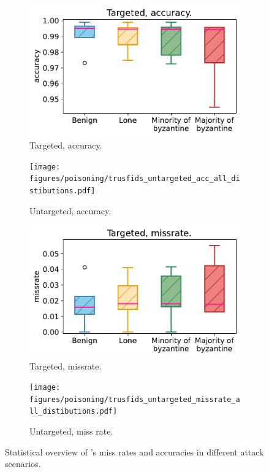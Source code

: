 \begin{figure}
  \centering 
  \begin{subfigure}{0.45\columnwidth}
    \centering 
    \includegraphics[width=\linewidth]{figures/poisoning/trusfids_targeted_acc_all_distibutions.pdf}    \caption{Targeted, accuracy.}
    \label{fig:trusfids_targeted_acc_all_distibutions}
  \end{subfigure}
  \begin{subfigure}{0.45\columnwidth}
    \centering 
    \texttt{[image: figures/poisoning/trusfids\_untargeted\_acc\_all\_distibutions.pdf]}    \caption{Untargeted, accuracy.}
    \label{fig:trusfids_untargeted_acc_all_distibutions}
  \end{subfigure}
    
    \begin{subfigure}{0.45\columnwidth}
    \centering 
    \includegraphics[width=\linewidth]{figures/poisoning/trusfids_targeted_missrate_all_distibutions.pdf}    \caption{Targeted, missrate.}
    \label{fig:trusfids_targeted_missrate_all_distibutions}
  \end{subfigure}
   \begin{subfigure}{0.45\columnwidth}
    \centering 
    \texttt{[image: figures/poisoning/trusfids\_untargeted\_missrate\_all\_distibutions.pdf]}    \caption{Untargeted, miss rate.}
    \label{fig:trusfids_untargeted_missrate_all_distibutions}
  \end{subfigure}
  \hfill
  \caption{Statistical overview of \thecontrib's miss rates and accuracies in different attack scenarios.}
  \label{fig:trustfids_accuracy_missrate_distribution}
  
\end{figure}

